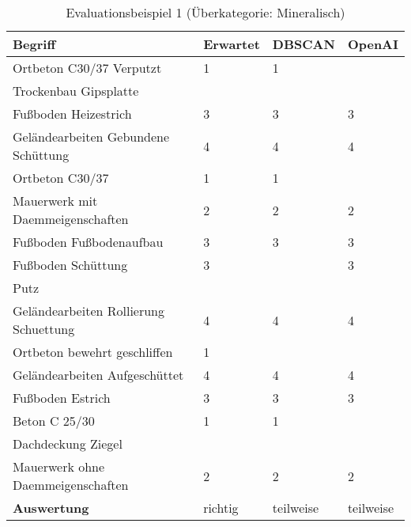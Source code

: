 \begin{table}[h]

	\centering
\begin{tabular}{|l|l|l|l|}
	\hline
	\textbf{Begriff} & \textbf{Erwartet} & \textbf{DBSCAN} & \textbf{OpenAI}\\ \hline
   Ortbeton C30/37 Verputzt & 1 & 1 & ~ \\ \hline
Trockenbau Gipsplatte & ~ & ~ & ~ \\ \hline
Fußboden Heizestrich & 3 & 3 & 3 \\ \hline
Geländearbeiten Gebundene Schüttung & 4 & 4 & 4 \\ \hline
Ortbeton C30/37 & 1 & 1 & ~ \\ \hline
Mauerwerk mit Daemmeigenschaften & 2 & 2 & 2 \\ \hline
Fußboden Fußbodenaufbau & 3 & 3 & 3 \\ \hline
Fußboden Schüttung & 3 & ~ & 3 \\ \hline
Putz & ~ & ~ & ~ \\ \hline
Geländearbeiten Rollierung Schuettung & 4 & 4 & 4 \\ \hline
Ortbeton bewehrt geschliffen & 1 & ~ & ~ \\ \hline
Geländearbeiten Aufgeschüttet & 4 & 4 & 4 \\ \hline
Fußboden Estrich & 3 & 3 & 3 \\ \hline
Beton C 25/30 & 1 & 1 & ~ \\ \hline
Dachdeckung Ziegel & ~ & ~ & ~ \\ \hline
Mauerwerk ohne Daemmeigenschaften & 2 & 2 & 2 \\ \hline
\textbf{Auswertung} & richtig & teilweise & teilweise \\ \hline
	\end{tabular}
	\caption{Evaluationsbeispiel 1 (Überkategorie: Mineralisch)}
	\label{t:evaluation-example1}
\end{table}

